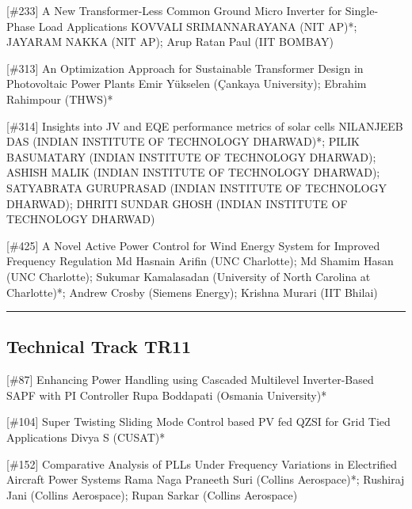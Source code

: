 {} \begin{abstract_online} {[\#233] A New Transformer-Less Common Ground Micro Inverter for Single-Phase Load Applications} {} {KOVVALI SRIMANNARAYANA (NIT AP)*; JAYARAM NAKKA (NIT AP); Arup Ratan  Paul (IIT BOMBAY)} {}  \end{abstract_online} 
{} \begin{abstract_online} {[\#313] An Optimization Approach for Sustainable Transformer Design in Photovoltaic Power Plants} {} {Emir Yükselen (Çankaya University); Ebrahim Rahimpour (THWS)*} {}  \end{abstract_online} 
{} \begin{abstract_online} {[\#314] Insights into JV and EQE performance metrics of solar cells} {} {NILANJEEB DAS (INDIAN INSTITUTE OF TECHNOLOGY DHARWAD)*; PILIK BASUMATARY (INDIAN INSTITUTE OF TECHNOLOGY DHARWAD); ASHISH MALIK (INDIAN INSTITUTE OF TECHNOLOGY DHARWAD); SATYABRATA GURUPRASAD (INDIAN INSTITUTE OF TECHNOLOGY DHARWAD); DHRITI SUNDAR GHOSH (INDIAN INSTITUTE OF TECHNOLOGY DHARWAD)} {}  \end{abstract_online} 
{} \begin{abstract_online} {[\#425] A Novel Active Power Control for Wind Energy System for Improved Frequency Regulation} {} {Md Hasnain  Arifin (UNC Charlotte); Md Shamim  Hasan (UNC Charlotte); Sukumar Kamalasadan (University of North Carolina at Charlotte)*; Andrew Crosby (Siemens Energy); Krishna Murari (IIT Bhilai)} {}  \end{abstract_online} 
\hrule  \subsection{Technical Track TR11}\nopagebreak {} \begin{abstract_online} {[\#87] Enhancing Power Handling using Cascaded Multilevel Inverter-Based SAPF with PI Controller} {} {Rupa Boddapati (Osmania University)*} {}  \end{abstract_online} 
{} \begin{abstract_online} {[\#104] Super Twisting Sliding Mode Control based PV fed  QZSI for Grid Tied Applications} {} {Divya  S (CUSAT)*} {}  \end{abstract_online} 
{} \begin{abstract_online} {[\#152] Comparative Analysis of PLLs Under Frequency Variations in Electrified Aircraft Power Systems} {} {Rama Naga Praneeth Suri (Collins Aerospace)*; Rushiraj Jani (Collins Aerospace); Rupan Sarkar (Collins Aerospace)} {}  \end{abstract_online} 
